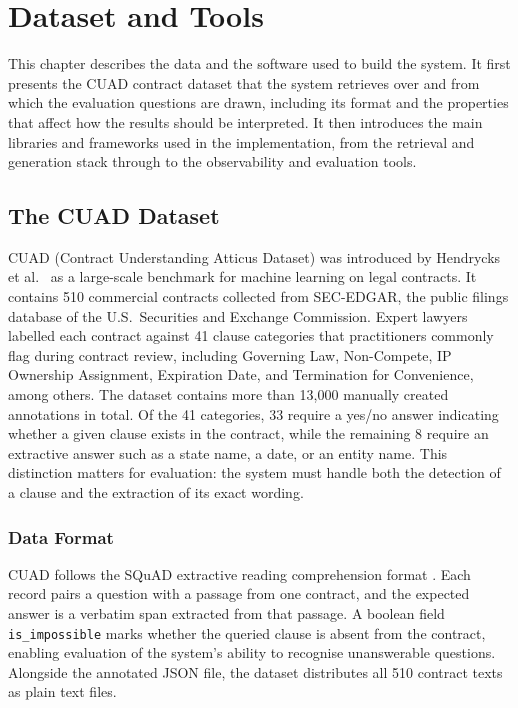 \chapter{Dataset and Tools}
\label{chap4}

This chapter describes the data and the software used to build the system. It first presents the CUAD contract dataset that the system retrieves over and from which the evaluation questions are drawn, including its format and the properties that affect how the results should be interpreted. It then introduces the main libraries and frameworks used in the implementation, from the retrieval and generation stack through to the observability and evaluation tools.

\section{The CUAD Dataset}

CUAD (Contract Understanding Atticus Dataset) was introduced by Hendrycks et al.\ \cite{hendrycks2021cuad} as a large-scale benchmark for machine learning on legal contracts. It contains 510 commercial contracts collected from SEC-EDGAR, the public filings database of the U.S.\ Securities and Exchange Commission. Expert lawyers labelled each contract against 41 clause categories that practitioners commonly flag during contract review, including Governing Law, Non-Compete, IP Ownership Assignment, Expiration Date, and Termination for Convenience, among others. The dataset contains more than 13{,}000 manually created annotations in total. Of the 41 categories, 33 require a yes/no answer indicating whether a given clause exists in the contract, while the remaining 8 require an extractive answer such as a state name, a date, or an entity name. This distinction matters for evaluation: the system must handle both the detection of a clause and the extraction of its exact wording.
\subsection{Data Format}

CUAD follows the SQuAD extractive reading comprehension format \cite{rajpurkar2016squad}. Each record pairs a question with a passage from one contract, and the expected answer is a verbatim span extracted from that passage. A boolean field \texttt{is\_impossible} marks whether the queried clause is absent from the contract, enabling evaluation of the system's ability to recognise unanswerable questions. Alongside the annotated JSON file, the dataset distributes all 510 contract texts as plain text files.

